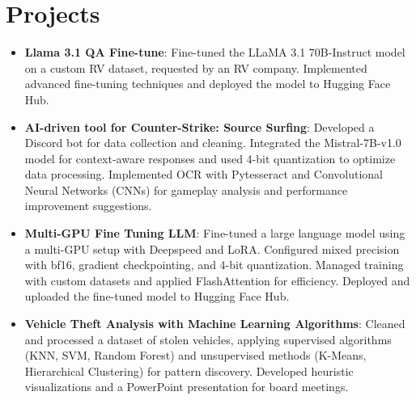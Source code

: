 \documentclass[letterpaper,11pt]{article}
\newcommand{\resumeItem}[2]{
  \item\small{
    \textbf{#1}{: #2 \vspace{-2pt}}
  }
}
\newcommand{\resumeSubItem}[2]{\resumeItem{#1}{#2}\vspace{-4pt}}
\newcommand{\resumeSubHeadingListStart}{\begin{itemize}[leftmargin=*, itemsep=0pt]}
\newcommand{\resumeSubHeadingListEnd}{\end{itemize}}
\begin{document}
\section{Projects}
  \resumeSubHeadingListStart
    
    \resumeSubItem{Llama 3.1 QA Fine-tune}
      {Fine-tuned the LLaMA 3.1 70B-Instruct model on a custom RV dataset, requested by an RV company. Implemented advanced fine-tuning techniques and deployed the model to Hugging Face Hub.}
    \resumeSubItem{AI-driven tool for Counter-Strike: Source Surfing}
      {Developed a Discord bot for data collection and cleaning. Integrated the Mistral-7B-v1.0 model for context-aware responses and used 4-bit quantization to optimize data processing. Implemented OCR with Pytesseract and Convolutional Neural Networks (CNNs) for gameplay analysis and performance improvement suggestions.}
    \resumeSubItem{Multi-GPU Fine Tuning LLM}
      {Fine-tuned a large language model using a multi-GPU setup with Deepspeed and LoRA. Configured mixed precision with bf16, gradient checkpointing, and 4-bit quantization. Managed training with custom datasets and applied FlashAttention for efficiency. Deployed and uploaded the fine-tuned model to Hugging Face Hub.}
    \resumeSubItem{Vehicle Theft Analysis with Machine Learning Algorithms}
      {Cleaned and processed a dataset of stolen vehicles, applying supervised algorithms (KNN, SVM, Random Forest) and unsupervised methods (K-Means, Hierarchical Clustering) for pattern discovery. Developed heuristic visualizations and a PowerPoint presentation for board meetings.}
  \resumeSubHeadingListEnd
\end{document}
